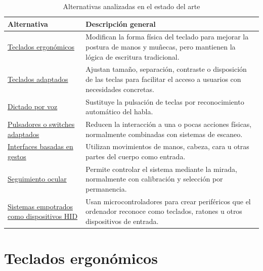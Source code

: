 \begin{table}[htbp]
    \centering
    \caption{Alternativas analizadas en el estado del arte}
    \label{tab:alternativas-estado-arte}
    \begin{tabularx}{\textwidth}{@{}p{}X@{}}
        \toprule
        \textbf{Alternativa} & \textbf{Descripción general} \\
        \midrule
        \hyperref[sec:teclados-ergonomicos]{Teclados ergonómicos}
        & Modifican la forma física del teclado para mejorar la postura de manos y muñecas, pero mantienen la lógica de escritura tradicional. \\

        \hyperref[sec:teclados-adaptados]{Teclados adaptados}
        & Ajustan tamaño, separación, contraste o disposición de las teclas para facilitar el acceso a usuarios con necesidades concretas. \\

        \hyperref[sec:dictado-voz]{Dictado por voz}
        & Sustituye la pulsación de teclas por reconocimiento automático del habla. \\

        \hyperref[sec:pulsadores-switches]{Pulsadores o switches adaptados}
        & Reducen la interacción a una o pocas acciones físicas, normalmente combinadas con sistemas de escaneo. \\

        \hyperref[sec:interfaces-gestos]{Interfaces basadas en gestos}
        & Utilizan movimientos de manos, cabeza, cara u otras partes del cuerpo como entrada. \\

        \hyperref[sec:eye-tracking]{Seguimiento ocular}
        & Permite controlar el sistema mediante la mirada, normalmente con calibración y selección por permanencia. \\

        \hyperref[sec:sistemas-hid]{Sistemas empotrados como dispositivos HID}
        & Usan microcontroladores para crear periféricos que el ordenador reconoce como teclados, ratones u otros dispositivos de entrada. \\
        \bottomrule
    \end{tabularx}
\end{table}


\section{Teclados ergonómicos}
\label{sec:teclados-ergonomicos}

